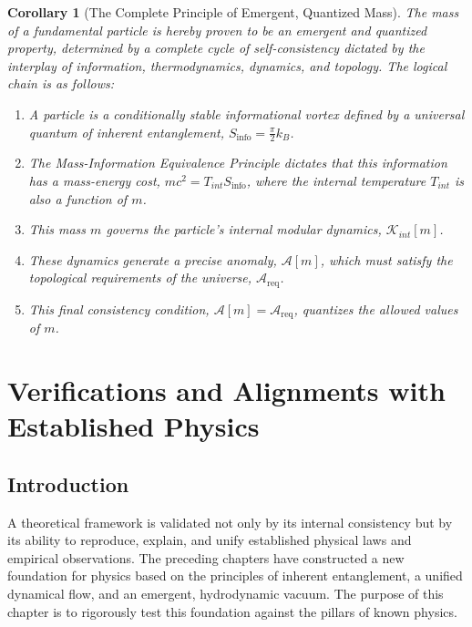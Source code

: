 \documentclass[11pt, letterpaper]{report}
\theoremstyle{plain} %
\newtheorem{corollary}[theorem]{Corollary}
\theoremstyle{definition} %
\theoremstyle{remark} %
\newcommand{\ModularK}{\mathcal{K}}
\begin{document}
\begin{corollary}[The Complete Principle of Emergent, Quantized Mass]
\label{cor:final_synthesis_of_mass}
The mass of a fundamental particle is hereby proven to be an emergent and quantized property, determined by a complete cycle of self-consistency dictated by the interplay of information, thermodynamics, dynamics, and topology. The logical chain is as follows:
\begin{enumerate}
    \item A particle is a conditionally stable informational vortex defined by a universal quantum of inherent entanglement, $S_{\text{info}} = \frac{\pi}{2}k_B$.
    \item The Mass-Information Equivalence Principle dictates that this information has a mass-energy cost, $m c^2 = T_{int} S_{\text{info}}$, where the internal temperature $T_{int}$ is also a function of $m$.
    \item This mass $m$ governs the particle's internal modular dynamics, $\ModularK_{int}[m]$.
    \item These dynamics generate a precise anomaly, $\mathcal{A}[m]$, which must satisfy the topological requirements of the universe, $\mathcal{A}_{\text{req}}$.
    \item This final consistency condition, $\mathcal{A}[m] = \mathcal{A}_{\text{req}}$, quantizes the allowed values of $m$.
\end{enumerate}
\end{corollary}










\chapter{Verifications and Alignments with Established Physics}
\label{chap:verifications}

\section{Introduction}

A theoretical framework is validated not only by its internal consistency but by its ability to reproduce, explain, and unify established physical laws and empirical observations. The preceding chapters have constructed a new foundation for physics based on the principles of inherent entanglement, a unified dynamical flow, and an emergent, hydrodynamic vacuum. The purpose of this chapter is to rigorously test this foundation against the pillars of known physics.
\end{document}
